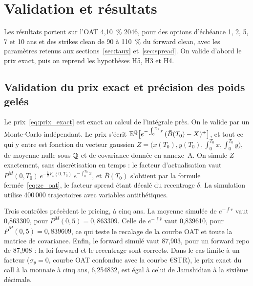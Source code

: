 \section{Validation et résultats}
\label{sec:resultats}

Les résultats portent sur l'OAT 4,10~\% 2046, pour des options d'échéance 1, 2, 5, 7 et 10 ans et des strikes
clean de 90 à 110~\% du forward clean, avec les paramètres retenus aux sections~\ref{sec:taux}
et~\ref{sec:spread}. On valide d'abord le prix exact, puis on reprend les hypothèses H5, H3 et H4.

\subsection{Validation du prix exact et précision des poids gelés}

Le prix~\eqref{eq:prix_exact} est exact au calcul de l'intégrale près. On le valide par un Monte-Carlo
indépendant. Le prix s'écrit
$\mathbb{E}^{\mathbb{Q}}\big[e^{-\int_0^{T_0}r}\,(\bar B(T_0)-X)^+\big]$, et tout ce qui y entre est fonction du vecteur
gaussien $Z = \big(x(T_0), y(T_0), \int_0^{T_0}x, \int_0^{T_0}y\big)$, de moyenne nulle sous $\mathbb{Q}$ et de covariance
donnée en annexe~A. On simule $Z$ exactement, sans discrétisation en temps : le facteur d'actualisation vaut
$P^M(0,T_0)\,e^{-\frac12V_x(0,T_0)}\,e^{-\int_0^{T_0}x}$, et $\bar B(T_0)$ s'obtient par la formule
fermée~\eqref{eq:zc_oat}, le facteur spread étant décalé du recentrage $\delta$. La simulation utilise 400\,000
trajectoires avec variables antithétiques.

Trois contrôles précèdent le pricing, à cinq ans. La moyenne simulée de $e^{-\int r}$ vaut 0,863309, pour
$P^M(0,5) = 0{,}863309$. Celle de $e^{-\int \bar r}$ vaut 0,839610, pour $\bar P^M(0,5) = 0{,}839609$, ce qui
teste le recalage de la courbe OAT et toute la matrice de covariance. Enfin, le forward simulé vaut 87,903, pour
un forward repo de 87,908 : la loi forward et le recentrage sont corrects. Dans le cas limite à un facteur
($\sigma_y = 0$, courbe OAT confondue avec la courbe €STR), le prix exact du call à la monnaie à cinq ans,
6,254832, est égal à celui de Jamshidian à la sixième décimale.

